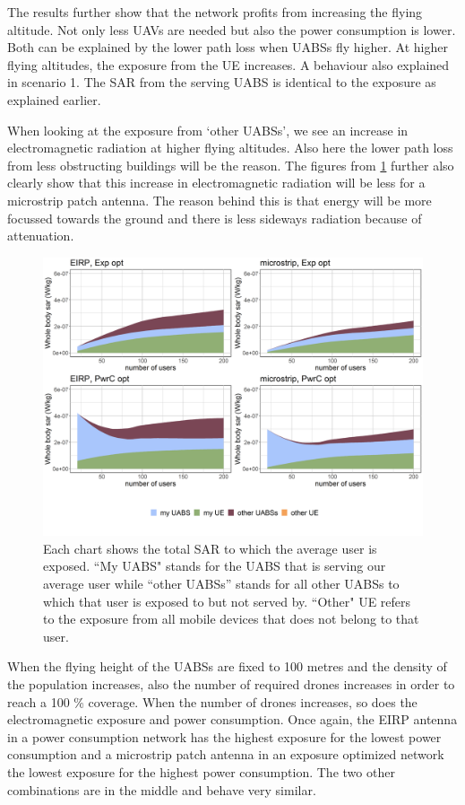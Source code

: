 \documentclass[twocolumn]{phdsymp} %
\begin{document}
The results further show that the network profits from increasing the flying altitude. Not only
less UAVs are needed but also the power consumption is lower. Both can be explained by the
lower path loss when UABSs fly higher. At higher flying altitudes, 
the exposure from the \gls{UE} increases. A behaviour also explained in scenario 1.
The SAR from the serving UABS is identical to the exposure as explained earlier.

When looking at the exposure from `other \gls{UABS}s', we see an increase in electromagnetic radiation at higher 
flying altitudes.
Also here the lower path loss from less obstructing buildings will be the reason.
The figures from \ref{fig:s3a_fourSourcesMatrix} further also clearly show that this increase 
in electromagnetic radiation will be less for a microstrip patch antenna. The reason behind this is that energy 
will be more focussed towards the ground and there is less sideways radiation because of attenuation.

\begin{figure}[]
  \includegraphics[width=\linewidth]{../results/s3/fhFourSources.png}
  \caption{Each chart shows the total SAR to which the average user is exposed. ``My UABS" stands for the UABS that is serving our average user while ``other UABSs'' stands for 
  all other UABSs to which that user is exposed to but not served by. ``Other" UE refers to the exposure from all mobile devices that does not belong to that user.}
  \label{fig:s3a_fourSourcesMatrix}
\end{figure}


When the flying height of the \gls{UABS}s are fixed to 100 metres and the density of the population increases, also 
the number of required drones increases in order to reach a 100 \% coverage. When the number of drones increases, 
so does the electromagnetic exposure and power consumption.
Once again, the EIRP antenna in a power consumption network has the highest exposure for the lowest power consumption
and a microstrip patch antenna in an exposure optimized network the lowest exposure for the highest power consumption.
The two other combinations are in the middle and behave very similar.
\end{document}

